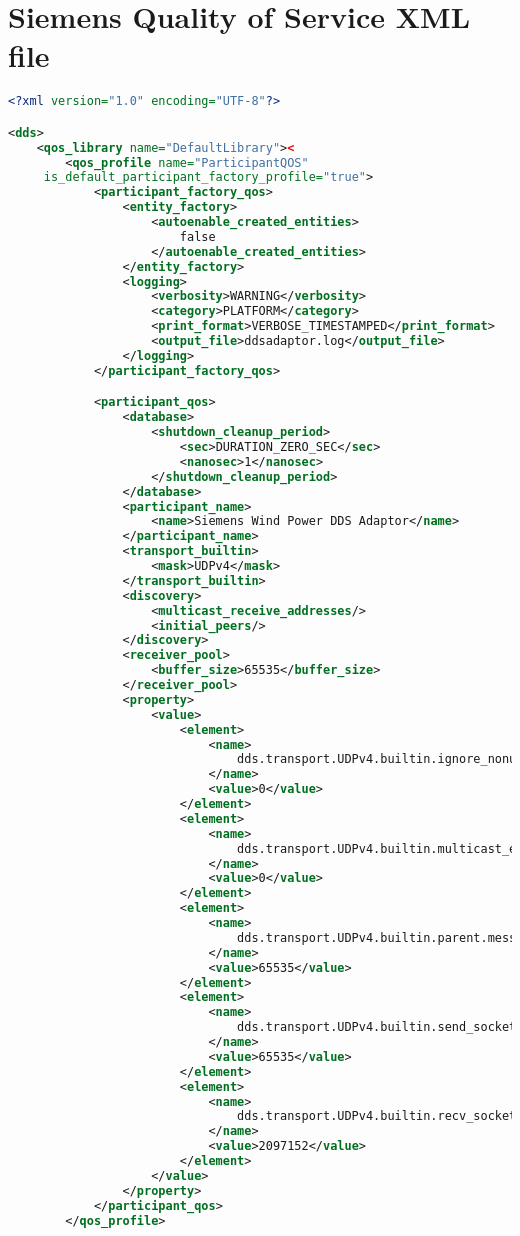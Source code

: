 \chapter{Siemens Quality of Service XML file}\label{appendix:siemensQosFile}
\begin{lstlisting}[language=XML]
<?xml version="1.0" encoding="UTF-8"?>

<dds>
	<qos_library name="DefaultLibrary"><
		<qos_profile name="ParticipantQOS"
	 is_default_participant_factory_profile="true">
			<participant_factory_qos>
				<entity_factory>
					<autoenable_created_entities>
						false
					</autoenable_created_entities>
				</entity_factory>
				<logging>
					<verbosity>WARNING</verbosity>
					<category>PLATFORM</category>
					<print_format>VERBOSE_TIMESTAMPED</print_format>
					<output_file>ddsadaptor.log</output_file>
				</logging>
			</participant_factory_qos>

			<participant_qos>
				<database>
					<shutdown_cleanup_period>
						<sec>DURATION_ZERO_SEC</sec>
						<nanosec>1</nanosec>
					</shutdown_cleanup_period>
				</database>
				<participant_name>
					<name>Siemens Wind Power DDS Adaptor</name>
				</participant_name>
				<transport_builtin>
					<mask>UDPv4</mask>
				</transport_builtin>
				<discovery>
					<multicast_receive_addresses/>
					<initial_peers/>
				</discovery>
				<receiver_pool>
					<buffer_size>65535</buffer_size>
				</receiver_pool>
				<property>
					<value>
						<element>
							<name>
								dds.transport.UDPv4.builtin.ignore_nonup_interfaces
							</name>
							<value>0</value>
						</element>
						<element>
							<name>
								dds.transport.UDPv4.builtin.multicast_enabled
							</name>
							<value>0</value>
						</element>
						<element>
							<name>
								dds.transport.UDPv4.builtin.parent.message_size_max
							</name>
							<value>65535</value>
						</element>
						<element>
							<name>
								dds.transport.UDPv4.builtin.send_socket_buffer_size
							</name>
							<value>65535</value>
						</element>
						<element>
							<name>
								dds.transport.UDPv4.builtin.recv_socket_buffer_size
							</name>
							<value>2097152</value>
						</element>
					</value>
				</property>
			</participant_qos>
		</qos_profile>


\end{lstlisting}
